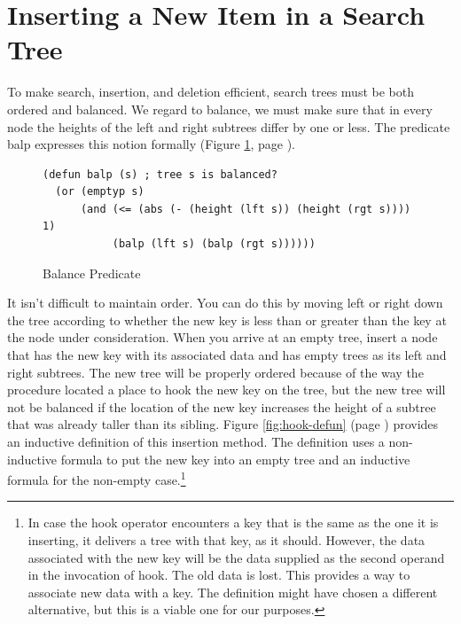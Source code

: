 \section{Inserting a New Item in a Search Tree}

To make search, insertion, and deletion efficient,
search trees must be both ordered and balanced.
We regard to balance,
we must make sure that in every node the heights of the left and right subtrees
differ by one or less.
\label{balance-defun}The predicate \textsf{balp} expresses this notion formally
(Figure \ref{fig:balance-defun}, page \pageref{fig:balance-defun}).

\begin{figure}
\begin{center}
\begin{code}
\begin{verbatim}
(defun balp (s) ; tree s is balanced?
  (or (emptyp s)
      (and (<= (abs (- (height (lft s)) (height (rgt s)))) 1)
           (balp (lft s) (balp (rgt s))))))
\end{verbatim}
\end{code}
\end{center}
\caption{Balance Predicate}
\label{fig:balance-defun}
\end{figure}

It isn't difficult to maintain order.
You can do this by moving left or right down the tree according
to whether the new key is less than or greater than the key at the node
under consideration.
When you arrive at an empty tree,
insert a node that has the new key
with its associated data
and has empty trees as its left and right subtrees.
The new tree will be properly ordered because
of the way the procedure located a place to
hook the new key on the tree,
but the new tree will not be balanced if
the location of the new key increases the height
of a subtree that was already taller than its sibling.
Figure \ref{fig:hook-defun} (page \pageref{fig:hook-defun}) provides
an inductive definition of this insertion method.
The definition uses a non-inductive formula
to put the new key into an empty tree
and an inductive formula for the non-empty case.\footnote{In
\label{same-key-new-data}
case the \textsf{hook} operator encounters a key that is the same
as the one it is inserting, it delivers a tree with that key, as it should.
However, the data associated with the new key will be the data supplied
as the second operand in the invocation of \textsf{hook}.
The old data is lost.
This provides a way to associate new data with a key.
The definition might have chosen a different alternative,
but this is a viable one for our purposes.}

